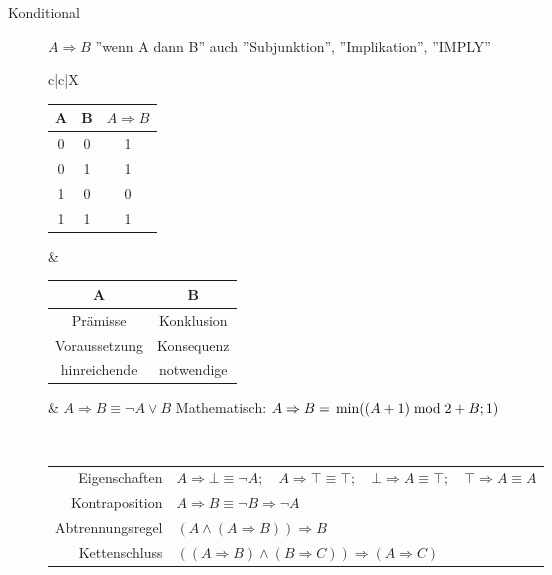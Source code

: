 \documentclass[12pt,a4paper]{article}
\begin{document}
\begin{description}
\begin{description}
			\item[Konditional] $A\Rightarrow B$ ''wenn A dann B'' auch ''Subjunktion'', ''Implikation'', ''IMPLY'' \\
				\begin{tabularx}{\linewidth}{c|c|X}
					\begin{tabular}[t]{c|c||c}
						A & B & $A \Rightarrow B$ \\ \hline\hline
						0 & 0 & 1                 \\ \hline
						0 & 1 & 1                 \\ \hline
						1 & 0 & 0                 \\ \hline
						1 & 1 & 1
					\end{tabular} &
					\begin{tabular}[t]{c|c}
						A             & B          \\ \hline
						Prämisse      & Konklusion \\
						Voraussetzung & Konsequenz \\
						hinreichende  & notwendige
					\end{tabular}      &
					$A \Rightarrow B \equiv \neg A \vee B$ \newline
					Mathematisch: $A \Rightarrow B = \newline \min((A + 1) \bmod 2 + B; 1)$ \\ \hline
				\end{tabularx} \\
				\begin{tabular}[t]{rl}
					Eigenschaften    & $A \Rightarrow \bot \equiv \neg A; \quad A \Rightarrow \top \equiv \top; \quad \bot \Rightarrow A \equiv \top; \quad \top \Rightarrow A \equiv A$ \\
					Kontraposition   & $A \Rightarrow B \equiv \neg B \Rightarrow \neg A$                                                                                                \\
					Abtrennungsregel & $(A \wedge (A \Rightarrow B)) \Rightarrow B$                                                                                                      \\
					Kettenschluss    & $((A \Rightarrow B) \wedge (B \Rightarrow C)) \Rightarrow (A \Rightarrow C)$
				\end{tabular}


\end{description}
\end{description}
\end{document}
